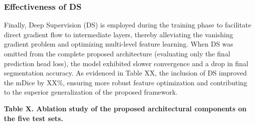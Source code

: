 \subsubsection{Effectiveness of DS}\label{effectiveness-of-ds}

Finally, Deep Supervision (DS) is employed during the training phase to
facilitate direct gradient flow to intermediate layers, thereby
alleviating the vanishing gradient problem and optimizing multi-level
feature learning. When DS was omitted from the complete proposed
architecture (evaluating only the final prediction head loss), the model
exhibited slower convergence and a drop in final segmentation accuracy.
As evidenced in Table XX, the inclusion of DS improved the mDice by
XX\%, ensuring more robust feature optimization and contributing to the
superior generalization of the proposed framework.

\textbf{Table X. Ablation study of the proposed architectural components
on the five test sets.}

